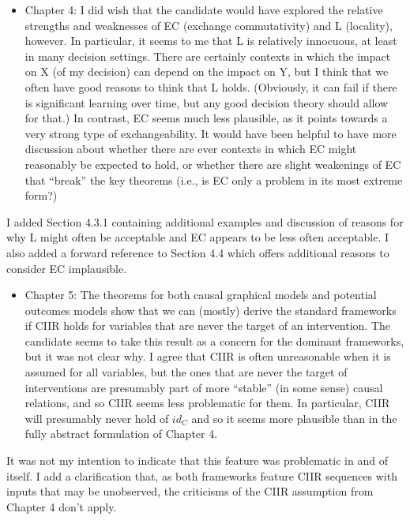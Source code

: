 \documentclass[12pt, a4paper]{article}
\begin{document}
\begin{itemize}
    \item Chapter 4: I did wish that the candidate would have explored the relative strengths and weaknesses of EC (exchange commutativity) and L (locality), however. In particular, it seems to me that L is relatively innocuous, at least in many decision settings. There are certainly contexts in which the impact on X (of my decision) can depend on the impact on Y, but I think that we often have good reasons to think that L holds. (Obviously, it can fail if there is significant learning over time, but any good decision theory should allow for that.) In contrast, EC seems much less plausible, as it points towards a very strong type of exchangeability. It would have been helpful to have more discussion about whether there are ever contexts in which EC might reasonably be expected to hold, or whether there are slight weakenings of EC that “break” the key theorems (i.e., is EC only a problem in its most extreme form?)
\end{itemize}

I added Section 4.3.1 containing additional examples and discussion of reasons for why L might often be acceptable and EC appears to be less often acceptable. I also added a forward reference to Section 4.4 which offers additional reasons to consider EC implausible.

\begin{itemize}
    \item Chapter 5: The theorems for both causal graphical models and potential outcomes models show that we can (mostly) derive the standard frameworks if CIIR holds for variables that are never the target of an intervention. The candidate seems to take this result as a concern for the dominant frameworks, but it was not clear why. I agree that CIIR is often unreasonable when it is assumed for all variables, but the ones that are never the target of interventions are presumably part of more “stable” (in some sense) causal relations, and so CIIR seems less problematic for them. In particular, CIIR will presumably never hold of $id_C$ and so it seems more plausible than in the fully abstract formulation of Chapter 4.
\end{itemize}


It was not my intention to indicate that this feature was problematic in and of itself. I add a clarification that, as both frameworks feature CIIR sequences with inputs that may be unobserved, the criticisms of the CIIR assumption from Chapter 4 don't apply.
\end{document}
